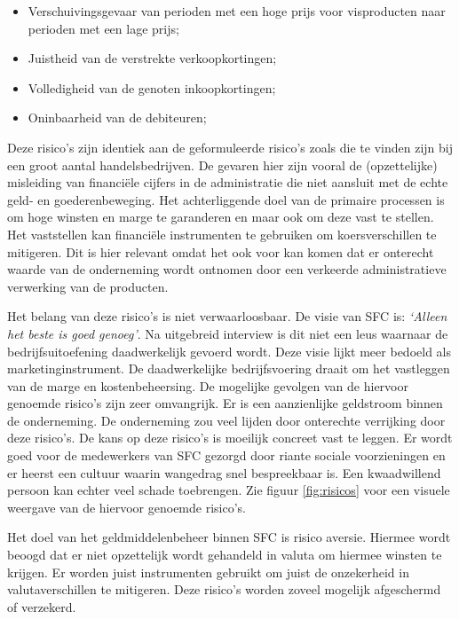 \begin{itemize}
    \item Verschuivingsgevaar van perioden met een hoge prijs voor visproducten naar perioden met een lage prijs;
    \item Juistheid van de verstrekte verkoopkortingen;
    \item Volledigheid van de genoten inkoopkortingen;
    \item Oninbaarheid van de debiteuren;
\end{itemize}

Deze risico's zijn identiek aan de geformuleerde risico's zoals die te vinden zijn bij een groot aantal handelsbedrijven. De gevaren hier zijn vooral de (opzettelijke) misleiding van financiële cijfers in de administratie die niet aansluit met de echte geld- en goederenbeweging. Het achterliggende doel van de primaire processen is om hoge winsten en marge te garanderen en maar ook om deze vast te stellen. Het vaststellen kan financiële instrumenten te gebruiken om koersverschillen te mitigeren. Dit is hier relevant omdat het ook voor kan komen dat er onterecht waarde van de onderneming wordt ontnomen door een verkeerde administratieve verwerking van de producten. 

Het belang van deze risico's is niet verwaarloosbaar. De visie van SFC is: \emph{`Alleen het beste is goed genoeg'}. Na uitgebreid interview is dit niet een leus waarnaar de bedrijfsuitoefening daadwerkelijk gevoerd wordt. Deze visie lijkt meer bedoeld als marketinginstrument. De daadwerkelijke bedrijfsvoering draait om het vastleggen van de marge en kostenbeheersing. De mogelijke gevolgen van de hiervoor genoemde risico's zijn zeer omvangrijk. Er is een aanzienlijke geldstroom binnen de onderneming. De onderneming zou veel lijden door onterechte verrijking door deze risico's. De kans op deze risico's is moeilijk concreet vast te leggen. Er wordt goed voor de medewerkers van SFC gezorgd door riante sociale voorzieningen en er heerst een cultuur waarin wangedrag snel bespreekbaar is. Een kwaadwillend persoon kan echter veel schade toebrengen. Zie figuur \ref{fig:risicos} voor een visuele weergave van de hiervoor genoemde risico's.

Het doel van het geldmiddelenbeheer binnen SFC is risico aversie. Hiermee wordt beoogd dat er niet opzettelijk wordt gehandeld in valuta om hiermee winsten te krijgen. Er worden juist instrumenten gebruikt om juist de onzekerheid in valutaverschillen te mitigeren. Deze risico's worden zoveel mogelijk afgeschermd of verzekerd. 

